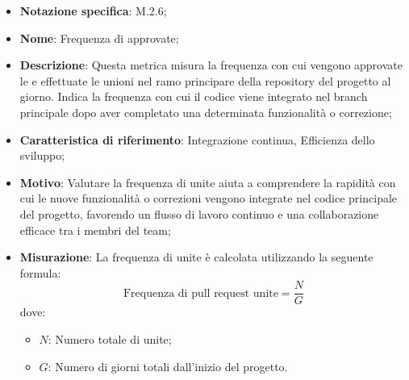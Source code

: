 \begin{itemize}
    \item \textbf{Notazione specifica}: M.2.6;
    \item \textbf{Nome}: Frequenza di  approvate;
    \item \textbf{Descrizione}: Questa metrica misura la frequenza con cui vengono approvate le  e effettuate le unioni nel ramo principare della repository del progetto al giorno. Indica la frequenza con cui il codice viene integrato nel branch principale dopo aver completato una determinata funzionalità o correzione;
    \item \textbf{Caratteristica di riferimento}: Integrazione continua, Efficienza dello sviluppo;
    \item \textbf{Motivo}: Valutare la frequenza di  unite aiuta a comprendere la rapidità con cui le nuove funzionalità o correzioni vengono integrate nel codice principale del progetto, favorendo un flusso di lavoro continuo e una collaborazione efficace tra i membri del team;
    \item \textbf{Misurazione}: La frequenza di  unite è calcolata utilizzando la seguente formula:
    \[
        \text{Frequenza di pull request unite} =\frac{N}{G} 
    \]
    dove:
    \begin{itemize}
        \item $N$: Numero totale di  unite;
        \item $G$: Numero di giorni totali dall'inizio del progetto.
    \end{itemize}
   
\end{itemize}
